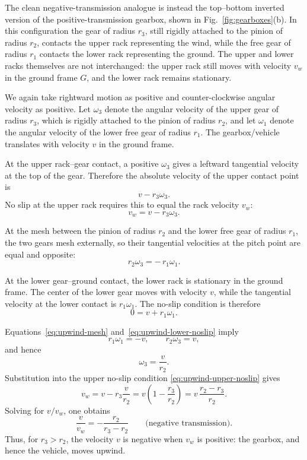 \documentclass[a4paper]{article}
\begin{document}
The clean negative-transmission analogue is instead the top--bottom inverted
version of the positive-transmission gearbox, shown in
Fig.~\ref{fig:gearboxes}(b).  In this configuration the gear of radius \(r_3\),
still rigidly attached to the pinion of radius \(r_2\), contacts the upper rack
representing the wind, while the free gear of radius \(r_1\) contacts the lower
rack representing the ground.  The upper and lower racks themselves are not
interchanged: the upper rack still moves with velocity \(v_w\) in the ground
frame \(G\), and the lower rack remains stationary.

We again take rightward motion as positive and counter-clockwise angular
velocity as positive.  Let \(\omega_3\) denote the angular velocity of the
upper gear of radius \(r_3\), which is rigidly attached to the pinion of radius
\(r_2\), and let \(\omega_1\) denote the angular velocity of the lower free
gear of radius \(r_1\).  The gearbox/vehicle translates with velocity \(v\)
in the ground frame.

At the upper rack--gear contact, a positive \(\omega_3\) gives a leftward
tangential velocity at the top of the gear.  Therefore the absolute velocity
of the upper contact point is
\[
v-r_3\omega_3 .
\]
No slip at the upper rack requires this to equal the rack velocity \(v_w\):
\begin{equation}
v_w = v-r_3\omega_3 .
\label{eq:upwind-upper-noslip}
\end{equation}

At the mesh between the pinion of radius \(r_2\) and the lower free gear of
radius \(r_1\), the two gears mesh externally, so their tangential velocities
at the pitch point are equal and opposite:
\begin{equation}
r_2\omega_3 = -\,r_1\omega_1 .
\label{eq:upwind-mesh}
\end{equation}

At the lower gear--ground contact, the lower rack is stationary in the ground
frame.  The center of the lower gear moves with velocity \(v\), while the
tangential velocity at the lower contact is \(r_1\omega_1\).  The no-slip
condition is therefore
\begin{equation}
0 = v+r_1\omega_1 .
\label{eq:upwind-lower-noslip}
\end{equation}

Equations~\eqref{eq:upwind-mesh} and~\eqref{eq:upwind-lower-noslip} imply
\[
r_1\omega_1=-v,
\qquad
r_2\omega_3=v,
\]
and hence
\[
\omega_3=\frac{v}{r_2}.
\]
Substitution into the upper no-slip condition
\eqref{eq:upwind-upper-noslip} gives
\[
v_w
 =
v-r_3\frac{v}{r_2}
 =
v\left(1-\frac{r_3}{r_2}\right)
 =
v\,\frac{r_2-r_3}{r_2}.
\]
Solving for \(v/v_w\), one obtains
\begin{equation}
\frac{v}{v_w}
=
-\frac{r_2}{r_3-r_2}
\qquad\text{(negative transmission).}
\label{eq:upwind-v-vw-ratio}
\end{equation}
Thus, for \(r_3>r_2\), the velocity \(v\) is negative when \(v_w\) is
positive: the gearbox, and hence the vehicle, moves upwind.
\end{document}
